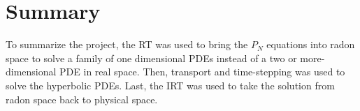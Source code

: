 
\section*{Summary}

To summarize the project, the RT was used to bring the $P_N$ equations\cite{BrunnerHolloway:1} into radon space to solve a family of one dimensional PDEs instead of a two or more-dimensional PDE in real space.
Then, transport and time-stepping\cite{PieracciniPuppo:3} was used to solve the hyperbolic PDEs.
Last, the IRT was used to take the solution from radon space back to physical space.